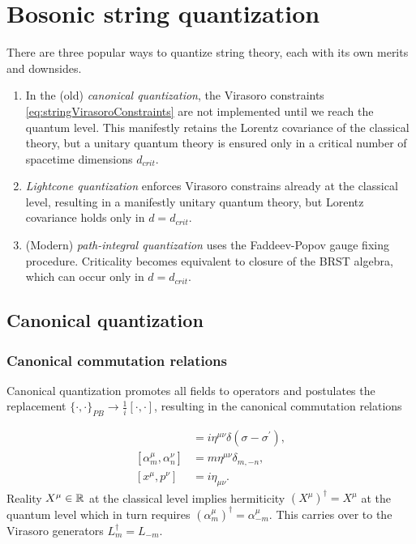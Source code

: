 \section{Bosonic string quantization}
There are three popular ways to quantize string theory, each with its own merits and downsides.
\begin{enumerate}
	\item In the (old) \emph{canonical quantization}, the Virasoro constraints \ref{eq:stringVirasoroConstraints} are not implemented until we reach the quantum level. This manifestly retains the Lorentz covariance of the classical theory, but a unitary quantum theory is ensured only in a critical number of spacetime dimensions $d_{crit}$.
	\item \emph{Lightcone quantization} enforces Virasoro constrains already at the classical level, resulting in a manifestly unitary quantum theory, but Lorentz covariance holds only in $d = d_{crit}$.
	\item (Modern) \emph{path-integral quantization} uses the Faddeev-Popov gauge fixing procedure. Criticality becomes equivalent to closure of the BRST algebra, which can occur only in $d=d_{crit}$.
\end{enumerate}
\subsection{Canonical quantization}
\subsubsection{Canonical commutation relations}
Canonical quantization promotes all fields to operators and postulates the replacement $\{\cdot,\cdot \}_{PB}\rightarrow \frac{1}{i} [\cdot,\cdot]$, resulting in the canonical commutation relations

\begin{align*}
	[X^\mu(\tau,\sigma),\Pi^\nu (\tau,\sigma^\prime)] &= i \eta^{\mu \nu} \delta(\sigma-\sigma^\prime),\\
	[\alpha^\mu_m,\alpha^\nu_n] &= m \eta^{\mu \nu} \delta_{m,-n}, \\
	[x^\mu,p^\nu] &= i \eta_{ \mu \nu}.
\end{align*}
Reality $X^\mu \in \mathbb{R}$ at the classical level implies hermiticity $(X^\mu)^\dagger = X^\mu$ at the quantum level which in turn requires $(\alpha^\mu_m)^\dagger=\alpha^\mu_{-m}$. This carries over to the Virasoro generators $L^\dagger_m= L_{-m}$.

